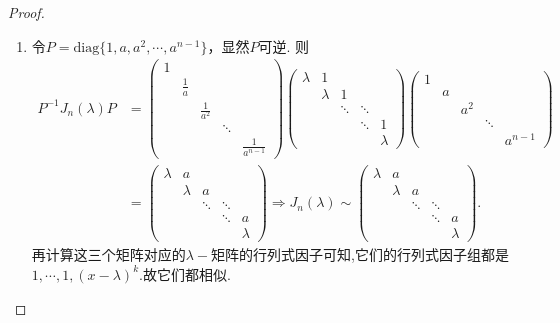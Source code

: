 \documentclass[../../main.tex]{subfiles}%
\begin{document}
\begin{proof}
\begin{enumerate}[(1)]
\item 令$P = \mathrm{diag}\{1, a, a^2, \cdots, a^{n-1}\}$，显然$P$可逆. 则
\begin{align*}
P^{-1}J_n(\lambda)P &= \begin{pmatrix}
1 & & & & \\
& \frac{1}{a} & & & \\
& & \frac{1}{a^2} & & \\
& & & \ddots & \\
& & & & \frac{1}{a^{n-1}}
\end{pmatrix} \begin{pmatrix}
\lambda & 1 & & & \\
& \lambda & 1 & & \\
& & \ddots & \ddots & \\
& & & \ddots & 1 \\
& & & & \lambda
\end{pmatrix} \begin{pmatrix}
1 & & & & \\
& a & & & \\
& & a^2 & & \\
& & & \ddots & \\
& & & & a^{n-1}
\end{pmatrix} \\
&= \begin{pmatrix}
\lambda & a & & & \\
& \lambda & a & & \\
& & \ddots & \ddots & \\
& & & \ddots & a \\
& & & & \lambda
\end{pmatrix} \Longrightarrow J_n(\lambda) \sim \begin{pmatrix}
\lambda & a & & & \\
& \lambda & a & & \\
& & \ddots & \ddots & \\
& & & \ddots & a \\
& & & & \lambda
\end{pmatrix}.
\end{align*}
再计算这三个矩阵对应的$\lambda-$矩阵的行列式因子可知,它们的行列式因子组都是$1,\cdots,1,(x-\lambda)^k$.故它们都相似.

\end{enumerate}

\end{proof}
\end{document}
